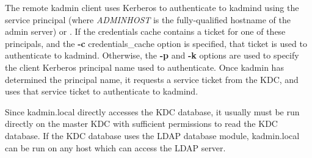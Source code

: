 \documentclass[letterpaper,10pt,english]{sphinxmanual}
\begin{document}
The remote kadmin client uses Kerberos to authenticate to kadmind
using the service principal  (where \emph{ADMINHOST} is
the fully-qualified hostname of the admin server) or .
If the credentials cache contains a ticket for one of these
principals, and the \textbf{-c} credentials\_cache option is specified, that
ticket is used to authenticate to kadmind.  Otherwise, the \textbf{-p} and
\textbf{-k} options are used to specify the client Kerberos principal name
used to authenticate.  Once kadmin has determined the principal name,
it requests a service ticket from the KDC, and uses that service
ticket to authenticate to kadmind.

Since kadmin.local directly accesses the KDC database, it usually must
be run directly on the master KDC with sufficient permissions to read
the KDC database.  If the KDC database uses the LDAP database module,
kadmin.local can be run on any host which can access the LDAP server.
\end{document}
